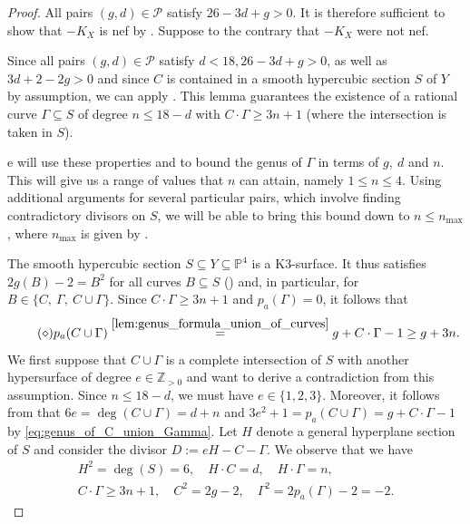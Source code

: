 \documentclass[english,11pt,reqno]{amsart}
\newcommand{\sub}{\subseteq}
\newcommand{\Pfour}{\mathbb{P}^4}
\newcommand{\Z}{\mathbb{Z}}
\begin{document}
\begin{proof}
All pairs $(g,d)\in \mathcal{P}$ satisfy $26-3d+g>0$. It is therefore sufficient to show that $-K_X$ is nef by . Suppose to the contrary that $-K_X$ were not nef. \par
Since all pairs $(g,d)\in \mathcal{P}$ satisfy $d<18, 26-3d+g>0$, as well as $3d+2-2g>0$ and since $C$ is contained in a smooth hypercubic section $S$ of $Y$ by assumption, we can apply . This lemma guarantees the existence of a rational curve $\Gamma \sub S$ of degree $n\leq 18-d$ with $C\cdot \Gamma \geq 3n+1$ (where the intersection is taken in $S$). \par
e will use these properties and  to bound the genus of $\Gamma$ in terms of $g,\:d$ and $n$. This will give us a range of values that $n$ can attain, namely $1\leq n\leq4$. Using additional arguments for several particular pairs, which involve finding contradictory divisors on $S$, we will be able to bring this bound down to $n\leq n_{\max}$, where $n_{\max}$ is given by .  \par 
The smooth hypercubic section $S\sub Y\sub \Pfour$ is a K3-surface. It thus satisfies $2g(B)-2=B^2$ for all curves $B\sub S$ () and, in particular, for $B\in\{C,\:\Gamma, \:C\cup \Gamma\}$. Since $C\cdot \Gamma \geq 3n+1$ and $p_a(\Gamma)=0$, it follows that
\begin{equation} \label{eq:genus_of_C_union_Gamma} \tag{$\diamond$}
p_a(C\cup \Gamma)\overset{\ref{lem:genus_formula_union_of_curves}}{=}g+C\cdot\Gamma -1 \geq g + 3n.
\end{equation}
%
We first suppose that $C\cup \Gamma$ is a complete intersection of $S$ with another hypersurface of degree $e\in\Z_{>0}$ and want to derive a contradiction from this assumption. Since $n\leq18-d$, we must have $e\in\{1,2,3\}$. Moreover, it follows from  that $6e=\deg(C\cup\Gamma)=d+n$ and $3e^2+1=p_a(C\cup \Gamma) = g+C\cdot \Gamma -1$ by \eqref{eq:genus_of_C_union_Gamma}. Let $H$ denote a general hyperplane section of $S$ and consider the divisor $D:=eH-C-\Gamma$.  We observe that we have 
\begin{gather*}
H^2 = \deg(S)=6, \quad H\cdot C = d,\quad H \cdot \Gamma = n,\\
C \cdot \Gamma \geq 3n+1, \quad C^2 = 2g-2, \quad \Gamma^2 = 2p_a(\Gamma)-2 = -2.

\end{gather*}
\end{proof}
\end{document}
